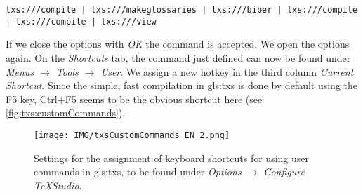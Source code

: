 \begin{lstlisting}[caption=Command for a complete compilation in \gls{gls:txs}.]
	txs:///compile | txs:///makeglossaries | txs:///biber | txs:///compile | txs:///compile | txs:///view
\end{lstlisting}

If we close the options with \textit{OK} the command is accepted. We open the options again. On the \textit{Shortcuts} tab, the command just defined can now be found under \textit{Menus $\rightarrow$ Tools $\rightarrow$ User}. We assign a new hotkey in the third column \textit{Current Shortcut}. Since the simple, fast compilation in \gls{gls:txs} is done by default using the F5 key, Ctrl+F5 seems to be the obvious shortcut here (see \autoref{fig:txs:customCommands}).

\begin{figure}[htb]
	\texttt{[image: IMG/txsCustomCommands\_EN\_2.png]}
	\caption[Settings for \gls{gls:txs} -- Shortcuts for User Commands]{Settings for the assignment of keyboard shortcuts for using user commands in \gls{gls:txs}, to be found under \textit{Options $\rightarrow$ Configure TeXStudio}.}
	\label{fig:txs:customCommands}
\end{figure}




